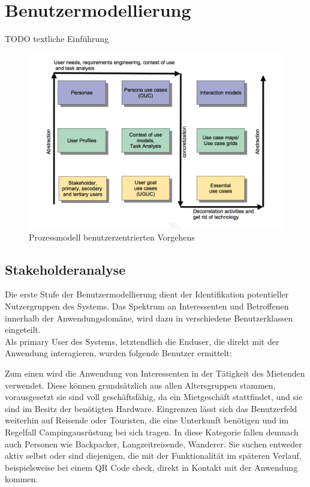 
\section{Benutzermodellierung}

TODO textliche Einführung

\begin{figure}[H]
\includegraphics[width=.9\textwidth]{./images/benutzermodellierung.png}
\caption{Prozessmodell benutzerzentrierten Vorgehens}
\label{prozessmodell}
\end{figure}

\subsection{Stakeholderanalyse}
Die erste Stufe der Benutzermodellierung dient der Identifikation potentieller Nutzergruppen des Systems.
Das Spektrum an Interessenten und Betroffenen innerhalb der Anwendungsdomäne, wird dazu in
verschiedene Benutzerklassen eingeteilt.\\
 
Als primary User des Systems, letztendlich die Enduser, die direkt mit der Anwendung interagieren, wurden folgende Benutzer ermittelt:
 
Zum einen wird die Anwendung von Interessenten in der Tätigkeit des Mietenden verwendet.
Diese können grundsätzlich aus allen Altersgruppen stammen, vorausgesetzt sie sind voll geschäftsfähig, da ein Mietgeschäft stattfindet, und sie sind im Besitz der benötigten Hardware.
Eingrenzen lässt sich das Benutzerfeld weiterhin auf Reisende oder Touristen, die eine Unterkunft benötigen und im Regelfall Campingausrüstung bei sich tragen. In diese Kategorie fallen demnach auch Personen wie Backpacker, Langzeitreisende, Wanderer.
Sie suchen entweder aktiv selbst oder sind diejenigen, die mit der Funktionalität im späteren Verlauf, beispielsweise bei einem QR Code check, direkt in Kontakt mit der Anwendung kommen.
 
